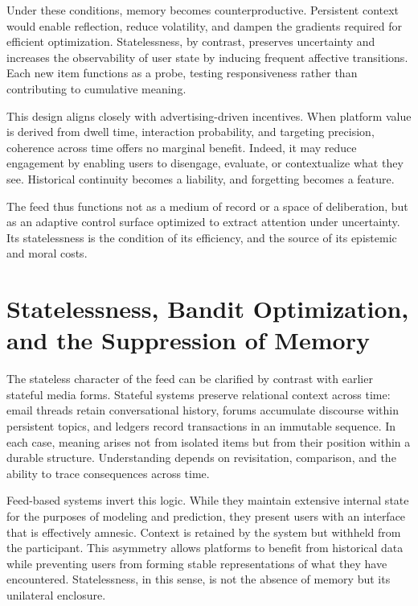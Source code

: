 \documentclass[12pt]{article}
\begin{document}
Under these conditions, memory becomes counterproductive. Persistent context would enable reflection, reduce volatility, and dampen the gradients required for efficient optimization. Statelessness, by contrast, preserves uncertainty and increases the observability of user state by inducing frequent affective transitions. Each new item functions as a probe, testing responsiveness rather than contributing to cumulative meaning.

This design aligns closely with advertising-driven incentives. When platform value is derived from dwell time, interaction probability, and targeting precision, coherence across time offers no marginal benefit. Indeed, it may reduce engagement by enabling users to disengage, evaluate, or contextualize what they see. Historical continuity becomes a liability, and forgetting becomes a feature.

The feed thus functions not as a medium of record or a space of deliberation, but as an adaptive control surface optimized to extract attention under uncertainty. Its statelessness is the condition of its efficiency, and the source of its epistemic and moral costs.

\section{Statelessness, Bandit Optimization, and the Suppression of Memory}

The stateless character of the feed can be clarified by contrast with earlier stateful media forms. Stateful systems preserve relational context across time: email threads retain conversational history, forums accumulate discourse within persistent topics, and ledgers record transactions in an immutable sequence. In each case, meaning arises not from isolated items but from their position within a durable structure. Understanding depends on revisitation, comparison, and the ability to trace consequences across time.

Feed-based systems invert this logic. While they maintain extensive internal state for the purposes of modeling and prediction, they present users with an interface that is effectively amnesic. Context is retained by the system but withheld from the participant. This asymmetry allows platforms to benefit from historical data while preventing users from forming stable representations of what they have encountered. Statelessness, in this sense, is not the absence of memory but its unilateral enclosure.
\end{document}
